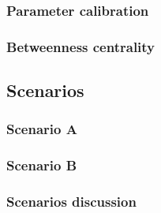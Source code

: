 \documentclass{article}
\begin{document}
\subsubsection{Parameter calibration}

\subsubsection{Betweenness centrality}

\subsection{Scenarios}

\subsubsection{Scenario A}

\subsubsection{Scenario B}

\subsubsection{Scenarios discussion}




\end{document}
